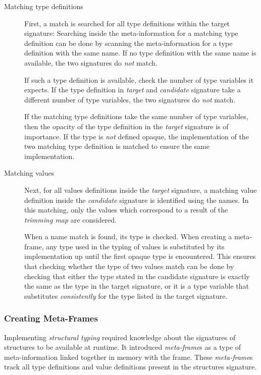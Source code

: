 \begin{description}
\item[Matching type definitions]
First, a match is searched for all type definitions within the target signature:
Searching inside the meta-information for a matching type definition can be done by scanning the meta-information for a type definition with the same name.
If no type definition with the same name is available, the two signatures do \emph{not} match.

If such a type definition is available, check the number of type variables  it expects.
If the type definition in \emph{target} and \emph{candidate} signature take a different number of type variables, the two signatures do \emph{not} match.

If the matching type definitions take the same number of type variables, then the opacity of the type definition in the \emph{target} signature is of importance. If the type is \emph{not} defined opaque, the implementation of the two matching type definition is matched to ensure the same implementation.
\item[Matching values]
Next, for all values definitions inside the \emph{target} signature, a matching value definition inside the \emph{candidate} signature is identified using the names.
In this matching, only the values which correspond to a result of the \emph{trimming map} are considered.

When a name match is found, its type is checked.
When creating a meta-frame, any type used in the typing of values is substituted by its implementation up until the first opaque type is encountered.
This ensures that checking whether the type of two values match can be done by checking that either the type stated in the candidate signature is exactly the same as the type in the target signature, or it is a type variable that substitutes \emph{consistently} for the type listed in the target signature.
\end{description}

\subsubsection{Creating Meta-Frames}
Implementing \emph{structural typing} required knowledge about the signatures of structures to be available at runtime.
It introduced \emph{meta-frame}s as a type of meta-information linked together in memory with the frame.
These \emph{meta-frame}s track all type definitions and value definitions present in the structures signature.

